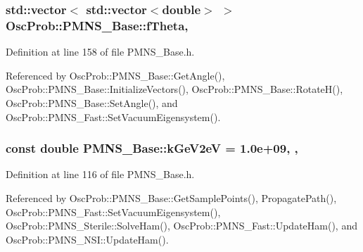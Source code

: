 \subsubsection[{\texorpdfstring{f\+Theta}{fTheta}}]{\setlength{\rightskip}{0pt plus 5cm}std\+::vector$<$ std\+::vector$<$double$>$ $>$ Osc\+Prob\+::\+P\+M\+N\+S\+\_\+\+Base\+::f\+Theta\hspace{0.3cm}{\ttfamily [protected]}, {\ttfamily [inherited]}}\hypertarget{classOscProb_1_1PMNS__Base_a1976887cd658dd86b2336c181f1470b4}{}\label{classOscProb_1_1PMNS__Base_a1976887cd658dd86b2336c181f1470b4}


Definition at line 158 of file P\+M\+N\+S\+\_\+\+Base.\+h.



Referenced by Osc\+Prob\+::\+P\+M\+N\+S\+\_\+\+Base\+::\+Get\+Angle(), Osc\+Prob\+::\+P\+M\+N\+S\+\_\+\+Base\+::\+Initialize\+Vectors(), Osc\+Prob\+::\+P\+M\+N\+S\+\_\+\+Base\+::\+Rotate\+H(), Osc\+Prob\+::\+P\+M\+N\+S\+\_\+\+Base\+::\+Set\+Angle(), and Osc\+Prob\+::\+P\+M\+N\+S\+\_\+\+Fast\+::\+Set\+Vacuum\+Eigensystem().

\subsubsection[{\texorpdfstring{k\+Ge\+V2eV}{kGeV2eV}}]{\setlength{\rightskip}{0pt plus 5cm}const double P\+M\+N\+S\+\_\+\+Base\+::k\+Ge\+V2eV = 1.\+0e+09\hspace{0.3cm}{\ttfamily [static]}, {\ttfamily [protected]}, {\ttfamily [inherited]}}\hypertarget{classOscProb_1_1PMNS__Base_ad36a0a6bf58d6ec093d3947784bd89e9}{}\label{classOscProb_1_1PMNS__Base_ad36a0a6bf58d6ec093d3947784bd89e9}


Definition at line 116 of file P\+M\+N\+S\+\_\+\+Base.\+h.



Referenced by Osc\+Prob\+::\+P\+M\+N\+S\+\_\+\+Base\+::\+Get\+Sample\+Points(), Propagate\+Path(), Osc\+Prob\+::\+P\+M\+N\+S\+\_\+\+Fast\+::\+Set\+Vacuum\+Eigensystem(), Osc\+Prob\+::\+P\+M\+N\+S\+\_\+\+Sterile\+::\+Solve\+Ham(), Osc\+Prob\+::\+P\+M\+N\+S\+\_\+\+Fast\+::\+Update\+Ham(), and Osc\+Prob\+::\+P\+M\+N\+S\+\_\+\+N\+S\+I\+::\+Update\+Ham().

